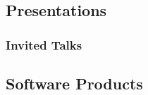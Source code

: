 \documentclass[letterpaper, 11pt]{article}
\begin{document}
\subsection*{Presentations}
\subsubsection*{Invited Talks}
\renewcommand*{\labelenumi}{[I\theenumi]}

\subsection*{Software Products}
\end{document}

